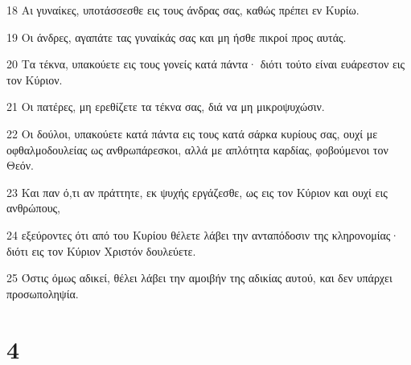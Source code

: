 \par 18 Αι γυναίκες, υποτάσσεσθε εις τους άνδρας σας, καθώς πρέπει εν Κυρίω.
\par 19 Οι άνδρες, αγαπάτε τας γυναίκάς σας και μη ήσθε πικροί προς αυτάς.
\par 20 Τα τέκνα, υπακούετε εις τους γονείς κατά πάντα· διότι τούτο είναι ευάρεστον εις τον Κύριον.
\par 21 Οι πατέρες, μη ερεθίζετε τα τέκνα σας, διά να μη μικροψυχώσιν.
\par 22 Οι δούλοι, υπακούετε κατά πάντα εις τους κατά σάρκα κυρίους σας, ουχί με οφθαλμοδουλείας ως ανθρωπάρεσκοι, αλλά με απλότητα καρδίας, φοβούμενοι τον Θεόν.
\par 23 Και παν ό,τι αν πράττητε, εκ ψυχής εργάζεσθε, ως εις τον Κύριον και ουχί εις ανθρώπους,
\par 24 εξεύροντες ότι από του Κυρίου θέλετε λάβει την ανταπόδοσιν της κληρονομίας· διότι εις τον Κύριον Χριστόν δουλεύετε.
\par 25 Όστις όμως αδικεί, θέλει λάβει την αμοιβήν της αδικίας αυτού, και δεν υπάρχει προσωποληψία.

\chapter{4}

